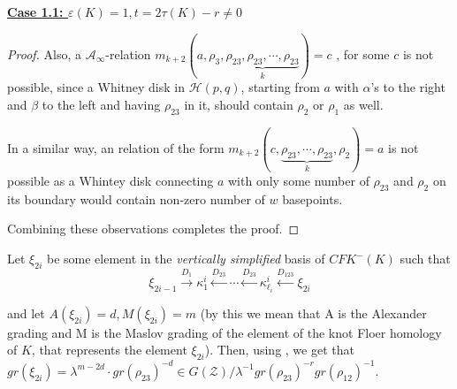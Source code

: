 \documentclass[11pt,reqno]{amsart}
\theoremstyle{definition}
\newtheorem *{remark}{Remark}
\newcommand{\cfkminus}{\mathit{CFK}^{-}}
\begin{document}
\begin{subsection}{\underline{\textbf{Case 1.1: $\varepsilon(K)=1, t = 2 \tau(K) - r \neq 0$}}}
\begin{proof}

Also, a $\mathcal{A}_{\infty}$-relation $m_{k+2}(a,\rho_3,\underbrace{\rho_{23},\rho_{23},\cdots,\rho_{23}}_{k}) = c$ , for some $c$ is not possible, since a Whitney disk in $\mathcal{H}(p,q)$, starting from $a$ with $\alpha$'s to the right and $\beta$ to the left and having $\rho_{23}$ in it, should contain $\rho_2$ or $\rho_1$ as well.


In a similar way, an relation of the form $m_{k+2}(c, \underbrace{\rho_{23}, \cdots, \rho_{23}}_{k}, \rho_2) = a$ is not possible as a Whintey disk connecting $a$ with only some number of $\rho_{23}$ and $\rho_2$ on its boundary would contain non-zero number of $w$ basepoints.


Combining these observations completes the proof. 
\end{proof}


 



Let $\xi_{2i}$ be some element in the \emph{vertically simplified} basis of $\cfkminus(K)$ such that
\[
        \xi_{2i-1} \xrightarrow{D_1} \kappa_1^i \xleftarrow{D_{23}} \cdots \xleftarrow{D_{23}} \kappa_{\ell_i}^i \xleftarrow{D_{123}} \xi_{2i} 
    \]

\noindent and let $A(\xi_{2i}) = d, M(\xi_{2i}) = m$ (by this we mean that A is the Alexander grading and M is the Maslov grading of the element of the knot Floer homology of $K$, that represents the element $\xi_{2i}$). Then, using \cite[Theorem A.11]{lot08}, we get that $gr(\xi_{2i}) = \lambda^{m-2d} \cdot gr(\rho_{23})^{-d} \in G(\mathcal{Z})/  \lambda^{-1} gr(\rho_{23})^{-r}gr(\rho_{12})^{-1}$.


\end{subsection}
\end{document}
